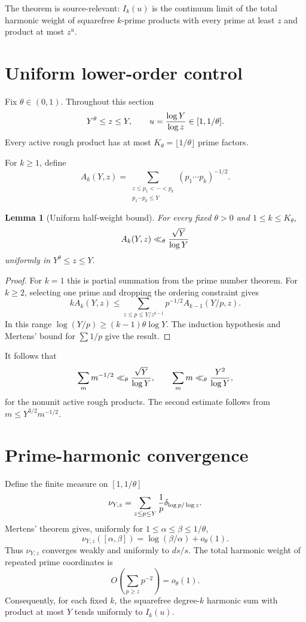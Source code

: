 \documentclass[11pt]{article}
\newtheorem{lemma}[theorem]{Lemma}
\begin{document}
The theorem is source-relevant: $I_k(u)$ is the continuum limit of the total
harmonic weight of squarefree $k$-prime products with every prime at least $z$
and product at most $z^u$.

\section{Uniform lower-order control}

Fix $\theta\in(0,1)$.  Throughout this section
\[
 Y^\theta\le z\le Y,
 \qquad
 u={\log Y\over\log z}\in[1,1/\theta].
\]
Every active rough product has at most
$K_\theta=\lfloor1/\theta\rfloor$ prime factors.

For $k\ge1$, define
\[
 A_k(Y,z)=
 \sum_{\substack{z\le p_1<\cdots<p_k\\p_1\cdots p_k\le Y}}
 (p_1\cdots p_k)^{-1/2}.
\]

\begin{lemma}[Uniform half-weight bound]\label{lem:halfweight}
For every fixed $\theta>0$ and $1\le k\le K_\theta$,
\[
 A_k(Y,z)\ll_\theta{\sqrt Y\over\log Y}
\]
uniformly in $Y^\theta\le z\le Y$.
\end{lemma}

\begin{proof}
For $k=1$ this is partial summation from the prime number theorem.  For
$k\ge2$, selecting one prime and dropping the ordering constraint gives
\[
 kA_k(Y,z)
 \le\sum_{z\le p\le Y/z^{k-1}}p^{-1/2}A_{k-1}(Y/p,z).
\]
In this range $\log(Y/p)\ge(k-1)\theta\log Y$.  The induction hypothesis and
Mertens' bound for $\sum1/p$ give the result.
\end{proof}

It follows that
\begin{equation}\label{eq:lowerorder}
 \sum_m m^{-1/2}\ll_\theta{\sqrt Y\over\log Y},
 \qquad
 \sum_m m\ll_\theta{Y^2\over\log Y},
\end{equation}
for the nonunit active rough products.  The second estimate follows from
$m\le Y^{3/2}m^{-1/2}$.

\section{Prime-harmonic convergence}

Define the finite measure on $[1,1/\theta]$
\[
 \nu_{Y,z}=\sum_{z\le p\le Y}{1\over p}
 \delta_{\log p/\log z}.
\]
Mertens' theorem gives, uniformly for
$1\le\alpha\le\beta\le1/\theta$,
\begin{equation}\label{eq:measure}
 \nu_{Y,z}([\alpha,\beta])
 =\log(\beta/\alpha)+o_\theta(1).
\end{equation}
Thus $\nu_{Y,z}$ converges weakly and uniformly to $ds/s$.  The total harmonic
weight of repeated prime coordinates is
\[
 O\left(\sum_{p\ge z}p^{-2}\right)=o_\theta(1).
\]
Consequently, for each fixed $k$, the squarefree degree-$k$ harmonic sum with
product at most $Y$ tends uniformly to $I_k(u)$.
\end{document}
